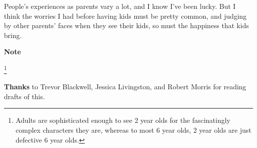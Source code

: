 People's experiences as parents vary a lot, and I know I've been lucky.
But I think the worries I had before having kids must be pretty common,
and judging by other parents' faces when they see their kids, so must
the happiness that kids bring.

\textbf{Note}

\footnote{Adults are sophisticated enough to see 2 year olds for the
fascinatingly complex characters they are, whereas to most 6 year olds,
2 year olds are just defective 6 year olds.}

\textbf{Thanks} to Trevor Blackwell, Jessica Livingston, and Robert
Morris for reading drafts of this.